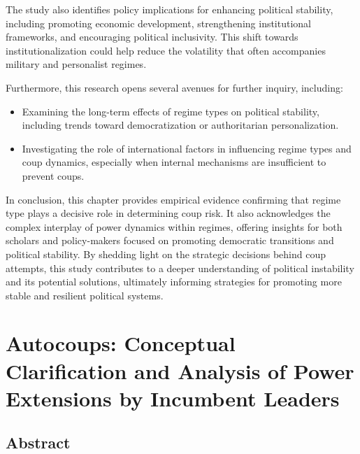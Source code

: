 \documentclass[
  12pt,
]{report}
\providecommand{\tightlist}{%
  \setlength{\itemsep}{0pt}\setlength{\parskip}{0pt}}\usepackage{longtable,booktabs,array}
\begin{document}
The study also identifies policy implications for enhancing political
stability, including promoting economic development, strengthening
institutional frameworks, and encouraging political inclusivity. This
shift towards institutionalization could help reduce the volatility that
often accompanies military and personalist regimes.

Furthermore, this research opens several avenues for further inquiry,
including:

\begin{itemize}
\tightlist
\item
  Examining the long-term effects of regime types on political
  stability, including trends toward democratization or authoritarian
  personalization.
\item
  Investigating the role of international factors in influencing regime
  types and coup dynamics, especially when internal mechanisms are
  insufficient to prevent coups.
\end{itemize}

In conclusion, this chapter provides empirical evidence confirming that
regime type plays a decisive role in determining coup risk. It also
acknowledges the complex interplay of power dynamics within regimes,
offering insights for both scholars and policy-makers focused on
promoting democratic transitions and political stability. By shedding
light on the strategic decisions behind coup attempts, this study
contributes to a deeper understanding of political instability and its
potential solutions, ultimately informing strategies for promoting more
stable and resilient political systems.

\chapter{Autocoups: Conceptual Clarification and Analysis of Power
Extensions by Incumbent Leaders}\label{sec-chapter3}

\section*{Abstract}\label{abstract-2}
\end{document}
